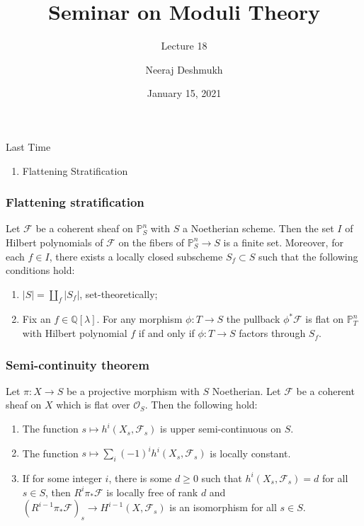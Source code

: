 \documentclass[ignorenonframetext,t]{beamer}
\title[Moduli@IISERP]{Seminar on Moduli Theory}
\subtitle{Lecture 18}
\author{Neeraj Deshmukh}
\date{January 15, 2021}
\newcommand{\sF}{{\mathcal F}}
\newcommand{\sO}{{\mathcal O}}
\renewcommand{\P}{{\mathbb P}}
\newcommand{\Q}{{\mathbb Q}}
\theoremstyle{definition}
\begin{document}
	
	
\begin{frame}
\titlepage
\end{frame}

\begin{frame}{Last Time}
\begin{enumerate}
	\item Flattening Stratification
\end{enumerate}
\end{frame}



\begin{frame}
	\frametitle{Flattening stratification}
	
	\begin{theorem}
		Let $\sF$ be a coherent sheaf on $\P^n_S$ with $S$ a Noetherian scheme. Then the set $I$ of Hilbert polynomials of $\sF$ on the fibers of $\P^n_S\rightarrow S$ is a finite set. Moreover, for each $f\in I$, there exists a locally closed subscheme $S_f\subset S$ such that the following conditions hold:
		\begin{enumerate}
			\item $|S|=\coprod_f |S_f|$, set-theoretically;
			\item Fix an $f\in \Q[\lambda]$. For any morphism $\phi: T\rightarrow S$ the pullback $\phi^*\sF$ is flat on $\P^n_T$ with Hilbert polynomial $f$ if and only if $\phi:T\rightarrow S$ factors through $S_f$.
		\end{enumerate}
	\end{theorem}
	
\end{frame}



\begin{frame}
	\frametitle{Semi-continuity theorem}
	
	\begin{theorem}
		Let $\pi: X\rightarrow S$ be a projective morphism with $S$ Noetherian. Let $\sF$ be a coherent sheaf on $X$ which is flat over $\sO_S$. Then the following hold:
		\begin{enumerate}
			\item The function $s\mapsto h^i(X_s,\sF_s)$ is upper semi-continuous on $S$.
			\item The function $s\mapsto \sum_i (-1)^i h^i(X_s,\sF_s)$ is locally constant.
			\item If for some integer $i$, there is some $d\geq 0$ such that $h^i(X_s,\sF_s)=d$ for all $s\in S$, then $R^i\pi_*\sF$ is locally free of rank $d$ and $(R^{i-1}\pi_*\sF)_s\rightarrow H^{i-1}(X,\sF_s)$ is an isomorphism for all $s\in S$.
		\end{enumerate}
	\end{theorem}
	
\end{frame}
\end{document}

